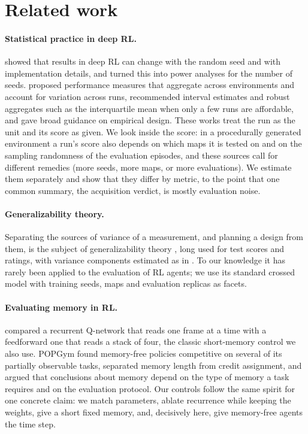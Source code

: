 \section{Related work}
\label{sec:related}

\paragraph{Statistical practice in deep RL.}
\citet{henderson2018matters} showed that results in deep RL can change with the random seed and
with implementation details, and \citet{colas2018seeds} turned this into power analyses for the
number of seeds. \citet{jordan2020evaluating} proposed performance measures that aggregate
across environments and account for variation across runs, \citet{agarwal2021precipice} recommended interval
estimates and robust aggregates such as the interquartile mean when only a few runs are
affordable, and \citet{patterson2024empirical} gave broad guidance on empirical design. These
works treat the run as the unit and its score as given. We look inside the score: in a
procedurally generated environment a run's score also depends on which maps it is tested on and
on the sampling randomness of the evaluation episodes, and these sources call for different
remedies (more seeds, more maps, or more evaluations). We estimate them separately and show that
they differ by metric, to the point that one common summary, the acquisition verdict, is mostly
evaluation noise.

\paragraph{Generalizability theory.}
Separating the sources of variance of a measurement, and planning a design from them, is the
subject of generalizability theory \citep{cronbach1972dependability,brennan2001generalizability},
long used for test scores and ratings, with variance components estimated as in
\citet{searle1992variance}. To our knowledge it has rarely been applied to the evaluation of RL
agents; we use its standard crossed model with training seeds, maps and evaluation replicas as
facets.

\paragraph{Evaluating memory in RL.}
\citet{hausknecht2015drqn} compared a recurrent Q-network that reads one frame at a time with a
feedforward one that reads a stack of four, the classic short-memory control we also use. POPGym
\citep{morad2023popgym} found memory-free policies competitive on several of its partially
observable tasks, \citet{ni2023transformers} separated memory length from credit assignment, and
\citet{cherepanov2024memory} argued that conclusions about memory depend on the type of memory a
task requires and on the evaluation protocol. Our controls follow the same spirit for one concrete
claim: we match parameters, ablate recurrence while keeping the weights, give a short fixed
memory, and, decisively here, give memory-free agents the time step.

